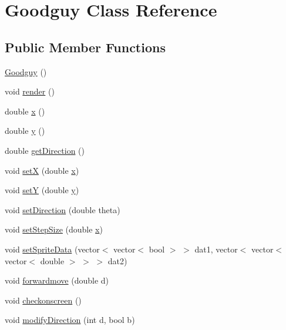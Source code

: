 \hypertarget{classGoodguy}{\section{Goodguy Class Reference}
\label{classGoodguy}
}
\subsection*{Public Member Functions}
\begin{DoxyCompactItemize}
\item 
\hyperlink{classGoodguy_afb1568272fa93e2a1a1ec1c286d5dc7f}{Goodguy} ()
\item 
void \hyperlink{classGoodguy_a83461365dd32fbbc57f868dfb1f0383a}{render} ()
\item 
double \hyperlink{classGoodguy_ad9f9605b707554ff049c1ea2ae09c2d7}{x} ()
\item 
double \hyperlink{classGoodguy_ace215862b33f5b583ef650395e3f7fce}{y} ()
\item 
double \hyperlink{classGoodguy_a69a2ab0ca9ffe024945e5c46fd4a6b8d}{get\-Direction} ()
\item 
void \hyperlink{classGoodguy_a0f29b27d6d54c7d5df42533bd8e941cc}{set\-X} (double \hyperlink{classGoodguy_ad9f9605b707554ff049c1ea2ae09c2d7}{x})
\item 
void \hyperlink{classGoodguy_af795a874895afd7950fb5a4fd9c22340}{set\-Y} (double \hyperlink{classGoodguy_ace215862b33f5b583ef650395e3f7fce}{y})
\item 
void \hyperlink{classGoodguy_a08bc938f3d98b5209b75a25270e8d659}{set\-Direction} (double theta)
\item 
void \hyperlink{classGoodguy_aab6af4f8231e631cccc16fc1dbf8ca0d}{set\-Step\-Size} (double \hyperlink{classGoodguy_ad9f9605b707554ff049c1ea2ae09c2d7}{x})
\item 
void \hyperlink{classGoodguy_ad8d5887f20387fb11a1e0c8ebdad876d}{set\-Sprite\-Data} (vector$<$ vector$<$ bool $>$ $>$ dat1, vector$<$ vector$<$ vector$<$ double $>$ $>$ $>$ dat2)
\item 
void \hyperlink{classGoodguy_a7f73b0958f6069456eab437ed1f99f41}{forwardmove} (double d)
\item 
void \hyperlink{classGoodguy_a755a96113f6f175560fc60a8e7eefa82}{checkonscreen} ()
\item 
void \hyperlink{classGoodguy_a8e50589f18e043ca18067cf17afb30b4}{modify\-Direction} (int d, bool b)
\end{DoxyCompactItemize}
